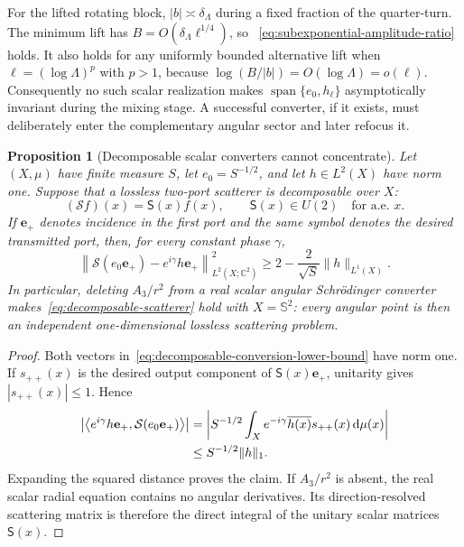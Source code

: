 \documentclass[11pt]{article}
\newcommand{\C}{\mathbb C}
\newcommand{\dd}{\,\mathrm d}
\newtheorem{proposition}[theorem]{Proposition}
\theoremstyle{definition}
\theoremstyle{remark}
\begin{document}
For the lifted rotating block, $|b|\asymp\delta_\Lambda$ during a fixed
fraction of the quarter-turn.  The minimum lift has
$B=O(\delta_\Lambda\ell^{1/4})$, so
~\eqref{eq:subexponential-amplitude-ratio} holds.  It also holds for any
uniformly bounded alternative lift when
$\ell=(\log\Lambda)^p$ with $p>1$, because
$\log(B/|b|)=O(\log\Lambda)=o(\ell)$.  Consequently no such scalar realization
makes $\operatorname{span}\{e_0,h_\ell\}$ asymptotically invariant during the
mixing stage.  A successful converter, if it exists, must deliberately enter
the complementary angular sector and later refocus it.

\begin{proposition}[Decomposable scalar converters cannot concentrate]
\label{prop:decomposable-converter-no-go}
Let $(X,\mu)$ have finite measure $S$, let $e_0=S^{-1/2}$, and let
$h\in L^2(X)$ have norm one.  Suppose that a lossless two-port scatterer is
decomposable over $X$:
\begin{equation}
 (\mathcal Sf)(x)=\mathsf S(x)f(x),
 \qquad \mathsf S(x)\in U(2)\quad\text{for a.e. }x.
 \label{eq:decomposable-scatterer}
\end{equation}
If $\mathbf e_+$ denotes incidence in the first port and the same symbol
denotes the desired transmitted port, then, for every constant phase $\gamma$,
\begin{equation}
 \left\|\mathcal S(e_0\mathbf e_+)
       -e^{i\gamma}h\mathbf e_+\right\|_{L^2(X;\C^2)}^2
 \geq 2-\frac{2}{\sqrt S}\|h\|_{L^1(X)}.
 \label{eq:decomposable-conversion-lower-bound}
\end{equation}
In particular, deleting $A_3/r^2$ from a real scalar angular Schr\"odinger
converter makes~\eqref{eq:decomposable-scatterer} hold with
$X=\mathbb S^2$: every angular point is then an independent one-dimensional
lossless scattering problem.
\end{proposition}

\begin{proof}
Both vectors in~\eqref{eq:decomposable-conversion-lower-bound} have norm one.
If $s_{++}(x)$ is the desired output component of
$\mathsf S(x)\mathbf e_+$, unitarity gives $|s_{++}(x)|\leq1$.  Hence
\begin{align}
 \left|\left\langle e^{i\gamma}h\mathbf e_+,
                   \mathcal S(e_0\mathbf e_+)\right\rangle\right|
 &=\left|S^{-1/2}\int_X e^{-i\gamma}\overline{h(x)}
                   s_{++}(x)\dd\mu(x)\right|\notag\\
 &\leq S^{-1/2}\|h\|_1.
\end{align}
Expanding the squared distance proves the claim.  If $A_3/r^2$ is absent,
the real scalar radial equation contains no angular derivatives.  Its
direction-resolved scattering matrix is therefore the direct integral of the
unitary scalar matrices $\mathsf S(x)$.
\end{proof}
\end{document}
